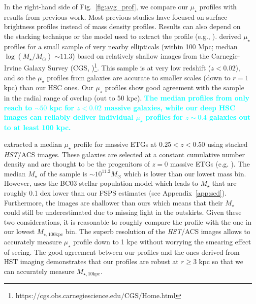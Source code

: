 \documentclass[a4paper,fleqn,usenatbib]{mnras}
\def\mstar{{$M_{\star}$}}
\def\logms{{$\log (M_{\star}/M_{\odot})$}}
\def\minn{{$M_{\star,10\mathrm{kpc}}$}}
\def\mtot{{$M_{\star,100\mathrm{kpc}}$}}
\def\mden{{$\mu_{\star}$}}
\newcommand{\song}[1]{\textcolor{cyan}{\textbf{#1}}}
\begin{document}
    In the right-hand side of Fig.~\ref{fig:avg_prof}, we compare our \mden{} 
    profiles with results from previous work. 
    Most previous studies have focused on surface brightness profiles instead 
    of mass density profiles.  
    Results can also depend on the stacking technique or the model used to extract 
    the profile (e.g., \citealt{Tal2011, DSouza2014}). 
    \citet{Huang2013a} derived \mden{} profiles for a small sample of very nearby 
    ellipticals (within 100 Mpc; median \logms{} ${\sim} 11.3$) based on relatively 
    shallow images from the Carnegie-Irvine Galaxy Survey 
    (CGS, \citealt{CGS1})\footnote{https://cgs.obs.carnegiescience.edu/CGS/Home.html}.  
    This sample is at very low redshift ($z<0.02$), and so the \mden{} profiles from 
    \citet{Huang2013a} galaxies are accurate to smaller scales (down to $r=1$ kpc) 
    than our HSC ones.  
    Our \mden{} profiles show good agreement with the \citet{Huang2013a} sample in 
    the radial range of overlap (out to 50 kpc). 
    \song{
    The median profiles from \citet{Huang2013a} only reach to ${\sim} 50$ kpc for 
    $z<0.02$ massive galaxies, while our deep HSC images can reliably deliver 
    individual \mden{} profiles for $z{\sim} 0.4$ galaxies out to at least 100 kpc.
    }  
    
    \citet{Patel2013} extracted a median \mden{} profile for massive ETGs at 
    $0.25 < z < 0.50$ using stacked \textit{HST}/ACS images. 
    These galaxies are selected at a constant cumulative number density and are 
    thought to be the progenitors of $z=0$ massive ETGs (e.g. \citealt{Leja2013}).  
    The median \mstar{} of the \citet{Patel2013} sample is 
    ${\sim} 10^{11.2} M_{\odot}$ which is lower than our lowest mass bin. 
    However, \citet{Patel2013} uses the BC03 stellar population model which leads to 
    \mstar{} that are roughly 0.1 dex lower than our FSPS estimates 
    (see Appendix~\ref{app:sed}). 
    Furthermore, the \citet{Patel2013} images are shallower than ours which means 
    that their \mstar{} could still be underestimated due to missing light in the 
    outskirts. 
    Given these two considerations, it is reasonable to roughly compare the 
    \citet{Patel2013} profile with the one in our lowest \mtot{} bin. 
    The superb resolution of the \textit{HST}/ACS images allows \citet{Patel2013} to 
    accurately measure \mden{} profile down to 1 kpc without worrying the smearing 
    effect of seeing. 
    The good agreement between our profiles and the ones derived from HST imaging 
    demonstrates that our profiles are robust at $r\geq 3$ kpc so that we can 
    accurately measure \minn{}.
    
\end{document}
